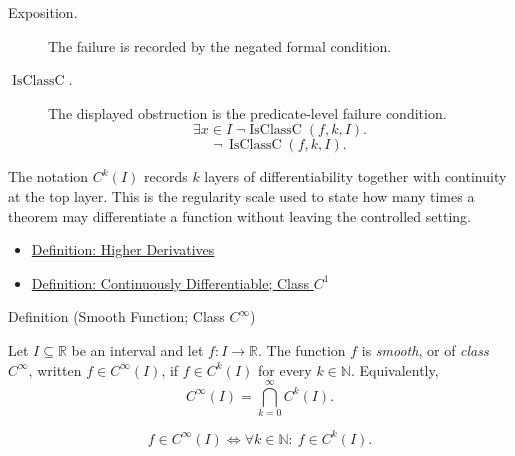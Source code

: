 \begin{remark*}
\begin{description}
  \item[Exposition.]
  The failure is recorded by the negated formal condition.

  \item[\(\operatorname{IsClassC}.\)]
  The displayed obstruction is the predicate-level failure condition.
  \[
  \exists x\in I\;\neg\operatorname{IsClassC}(f,k,I).
  \]
  \[
  \neg\,\operatorname{IsClassC}(f,k,I).
  \]
\end{description}
\end{remark*}


\begin{remark*}[Interpretation]
The notation \(C^k(I)\) records \(k\) layers of differentiability together with continuity at the top layer. This is the regularity scale used to state how many times a theorem may differentiate a function without leaving the controlled setting.
\end{remark*}

\begin{dependencies}
\begin{itemize}
  \item \hyperref[def:higher-derivatives]{Definition: Higher Derivatives}
  \item \hyperref[def:class-c1]{Definition: Continuously Differentiable; Class \(C^1\)}
\end{itemize}
\end{dependencies}

\begin{definitionbox}{Definition (Smooth Function; Class \(C^\infty\))}
\begin{definition}
\label{def:class-cinfty}
Let \(I\subseteq\mathbb{R}\) be an interval and let \(f:I\to\mathbb{R}\). The function \(f\) is \emph{smooth}, or of \emph{class \(C^\infty\)}, written \(f\in C^\infty(I)\), if \(f\in C^k(I)\) for every \(k\in\mathbb{N}\). Equivalently,
\[
  C^\infty(I)=\bigcap_{k=0}^{\infty}C^k(I).
\]
\end{definition}
\end{definitionbox}

\begin{remark*}
\[
  f\in C^\infty(I)
  \Longleftrightarrow
  \forall k\in\mathbb{N}:\ f\in C^k(I).
\]
\end{remark*}

